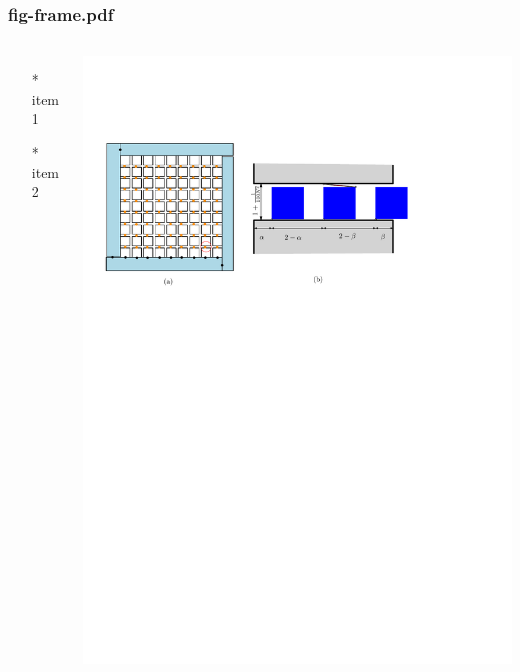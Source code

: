 \begin{frame} \frametitle{fig-frame.pdf}
    \begin{columns}[c]
        \begin{itemize}
            \item[*] item 1
            \item[*] item 2
        \end{itemize}
        \begin{minipage}{\linewidth}
            \begin{center}
            \includegraphics[width=.9\textwidth]{graphics/fig-frame.pdf}
            \label{gfx:fig-frame.pdf}
            \end{center}
        \end{minipage}
    \end{columns}
\end{frame}
